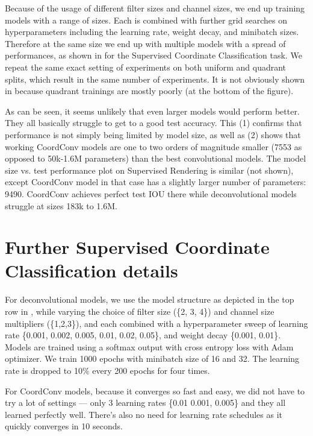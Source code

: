 \documentclass{article}
\begin{document}
Because of the usage of different filter sizes and channel sizes, we end up training models with a range of sizes. Each is combined with further grid searches on hyperparameters including the learning rate, weight decay, and minibatch sizes. 
Therefore at the same size we end up with multiple models with a spread of performances, as shown in  for the Supervised Coordinate Classification task. 
We repeat the same exact setting of experiments on both uniform and quadrant splits, which result in the same number of experiments. It is not obviously shown in  because quadrant trainings are mostly poorly (at the bottom of the figure).

As can be seen, it seems unlikely that even larger models would perform better. They all basically struggle to get to a good test accuracy. This (1) confirms that performance is not simply being limited by model size, as well as (2) shows that working CoordConv models are one to two orders of magnitude smaller (7553 as opposed to 50k-1.6M parameters) than the best convolutional models.
The model size vs. test performance plot on Supervised Rendering is similar (not shown), except CoordConv model in that case has a slightly larger number of parameters: 9490. CoordConv achieves perfect test IOU there while deconvolutional models struggle at sizes 183k to 1.6M.





\section{Further Supervised Coordinate Classification details}

For deconvolutional models, we use the model structure as depicted in the top row in , while varying the choice of filter size (\{2, 3, 4\}) and channel size multipliers (\{1,2,3\}), and each combined with a hyperparameter sweep of learning rate \{0.001, 0.002, 0.005, 0.01, 0.02, 0.05\}, and weight decay \{0.001, 0.01\}. Models are trained using a softmax output with cross entropy loss with Adam optimizer. We train 1000 epochs with minibatch size of 16 and 32. The learning rate is dropped to 10\% every 200 epochs for four times. 

For CoordConv models, because it converges so fast and easy, we did not have to try a lot of settings --- only 3 learning rates \{0.01 0.001, 0.005\} and they all learned perfectly well. There's also no need for learning rate schedules as it quickly converges in 10 seconds.
\end{document}
